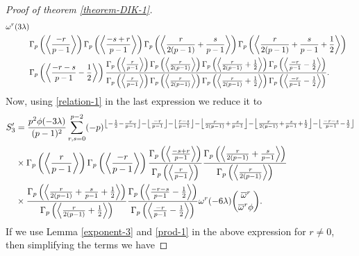 \documentclass[12pt]{amsart}
\theoremstyle{plain}
\theoremstyle{definition}
\theoremstyle{remark}
\numberwithin{equation}{section}
\begin{document}
\begin{proof}[Proof of theorem \ref{theorem-DIK-1}]
\begin{align}
 {\omega}^{r}(3\lambda)\notag\\
 &\Gamma_p\left(\left\langle\frac{-r}{p-1}\right\rangle\right)\Gamma_p\left(\left\langle\frac{-s+r}{p-1}\right\rangle\right)\Gamma_p\left(\left\langle\frac{r}{2(p-1)}+\frac{s}{p-1}\right\rangle\right)\Gamma_p\left(\left\langle\frac{r}{2(p-1)}+\frac{s}{p-1}+\frac{1}{2}\right\rangle\right)\notag\\&\Gamma_p\left(\left\langle\frac{-r-s}{p-1}-\frac{1}{2}\right\rangle\right)
   \frac{\Gamma_p\left(\left\langle\frac{r}{p-1}\right\rangle\right)\Gamma_p\left(\left\langle\frac{r}{2(p-1)}\right\rangle\right)\Gamma_p\left(\left\langle\frac{r}{2(p-1)}+\frac{1}{2}\right\rangle\right) \Gamma_p\left(\left\langle\frac{-r}{p-1} -\frac{1}{2}\right\rangle\right)}{\Gamma_p\left(\left\langle\frac{r}{p-1}\right\rangle\right)\Gamma_p\left(\left\langle\frac{r}{2(p-1)}\right\rangle\right)\Gamma_p\left(\left\langle\frac{r}{2(p-1)}+\frac{1}{2}\right\rangle\right) \Gamma_p\left(\left\langle\frac{-r}{p-1} -\frac{1}{2}\right\rangle\right)}.\notag
 \end{align}
 Now, using \eqref{relation-1} in the last expression we reduce it to
  \begin{align}
 S_3'&=  \frac{p^2\phi(-3\lambda)}{(p-1)^2} \sum_{r,s=0}^{p-2}(-p)^{\left\lfloor-\frac{1}{2}-\frac{r}{p-1}\right\rfloor-\left\lfloor\frac{-r}{p-1}\right\rfloor-\left\lfloor\frac{r-s}{p-1}\right\rfloor-\left\lfloor\frac{r}{2(p-1)}+\frac{s}{p-1}\right\rfloor-\left\lfloor\frac{r}{2(p-1)}+\frac{s}{p-1}+\frac{1}{2}\right\rfloor-\left\lfloor\frac{-r-s}{p-1}-\frac{1}{2}\right\rfloor}\notag \\
 &\times\Gamma_p\left(\left\langle\frac{r}{p-1}\right\rangle\right)
  \Gamma_p\left(\left\langle\frac{-r}{p-1}\right\rangle\right)
  \frac{\Gamma_p\left(\left\langle\frac{-s+r}{p-1}\right\rangle\right)}{\Gamma_p\left(\left\langle\frac{r}{p-1}\right\rangle\right)}
 \frac{ \Gamma_p\left(\left\langle\frac{r}{2(p-1)}+\frac{s}{p-1}\right\rangle\right)}{\Gamma_p\left(\left\langle\frac{r}{2(p-1)}\right\rangle\right)}\notag\\
 &\times
 \frac{\Gamma_p\left(\left\langle\frac{r}{2(p-1)}+\frac{s}{p-1}+\frac{1}{2}\right\rangle\right)}{\Gamma_p\left(\left\langle\frac{r}{2(p-1)}+\frac{1}{2}\right\rangle\right)}
 \frac{\Gamma_p\left(\left\langle\frac{-r-s}{p-1}-\frac{1}{2}\right\rangle\right)}{\Gamma_p\left(\left\langle\frac{-r}{p-1} -\frac{1}{2}\right\rangle\right)}{\omega}^r(-6\lambda) \binom{\overline{\omega}^r}{\overline{\omega}^r\phi}.
 \end{align}
 If we use Lemma \ref{exponent-3} and \eqref{prod-1} in the above expression for $r\neq0$, then simplifying the terms we have 

\end{proof}
\end{document}
